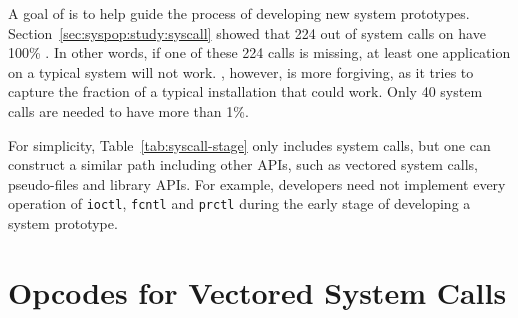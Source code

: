 A goal of \compatmetric{} is to help guide the process of developing new system prototypes.
Section~\ref{sec:syspop:study:syscall} showed that 224 out of \syscallnum{} system calls on \osdist{} have 100\% \usagemetric{}.
In other words, if one of these 224 calls is missing, at least one application on a typical system will not work.
\Compatmetric{}, however, is more forgiving, as
it tries to capture the fraction of a typical installation that could work.
Only 
40 system calls are needed to have \compatmetric{} more than 1\%.


For simplicity, Table~\ref{tab:syscall-stage}
only includes system calls, %
but one can construct a similar path including other APIs, %
such as vectored system calls, pseudo-files and library APIs.
For example, developers need not implement every operation of
{\tt ioctl}, {\tt fcntl} and {\tt prctl}
during the early stage of developing a system prototype.


\section{Opcodes for Vectored System Calls}
\label{sec:study:opcodes}



